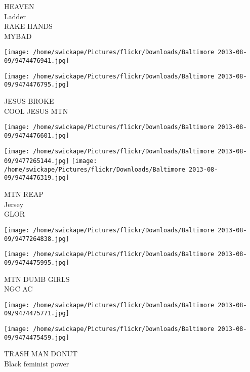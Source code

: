 \documentclass[10pt,letterpaper]{article}
\begin{document}
HEAVEN\\
Ladder\\
RAKE HANDS\\
MYBAD
\pagebreak

\texttt{[image: /home/swickape/Pictures/flickr/Downloads/Baltimore 2013-08-09/9474476941.jpg]}

\vspace{0.25in}
\texttt{[image: /home/swickape/Pictures/flickr/Downloads/Baltimore 2013-08-09/9474476795.jpg]}

JESUS BROKE\\
COOL JESUS MTN
\pagebreak

\texttt{[image: /home/swickape/Pictures/flickr/Downloads/Baltimore 2013-08-09/9474476601.jpg]}

\vspace{0.25in}
\texttt{[image: /home/swickape/Pictures/flickr/Downloads/Baltimore 2013-08-09/9477265144.jpg]}
\texttt{[image: /home/swickape/Pictures/flickr/Downloads/Baltimore 2013-08-09/9474476319.jpg]}

MTN REAP\\
Jersey\\
GLOR
\pagebreak

\texttt{[image: /home/swickape/Pictures/flickr/Downloads/Baltimore 2013-08-09/9477264838.jpg]}

\vspace{0.25in}
\texttt{[image: /home/swickape/Pictures/flickr/Downloads/Baltimore 2013-08-09/9474475995.jpg]}

MTN DUMB GIRLS\\
NGC AC
\pagebreak

\texttt{[image: /home/swickape/Pictures/flickr/Downloads/Baltimore 2013-08-09/9474475771.jpg]}

\vspace{0.25in}
\texttt{[image: /home/swickape/Pictures/flickr/Downloads/Baltimore 2013-08-09/9474475459.jpg]}

TRASH MAN DONUT\\
Black feminist power
\pagebreak
\end{document}
